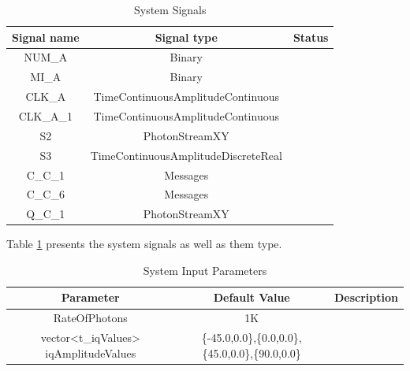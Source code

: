 \begin{enumerate}
\begin{table}[H]
\centering
\caption{System Signals}
\label{tb:signals}
\begin{tabular}{|c|c|c|}
\hline
\textbf{Signal name}            & \textbf{Signal type}                      & \textbf{Status} \\ \hline
NUM\_A                          &  Binary                                   &                 \\ \hline
MI\_A                           &  Binary                                   &                 \\ \hline
CLK\_A                          &  TimeContinuousAmplitudeContinuous        &                 \\ \hline
CLK\_A\_1                       &  TimeContinuousAmplitudeContinuous        &                 \\ \hline
S2                              &  PhotonStreamXY                           &                 \\ \hline
S3                              &  TimeContinuousAmplitudeDiscreteReal      &                 \\ \hline
C\_C\_1                         &  Messages                                 &                 \\ \hline
C\_C\_6                         &  Messages                                 &                 \\ \hline
Q\_C\_1                         &  PhotonStreamXY                           &                 \\ \hline

\end{tabular}
\end{table}

Table \ref{tb:signals} presents the system signals as well as them type.

\begin{table}[H]
\centering
\caption{System Input Parameters}
\label{tb:inputparameters}
\begin{tabular}{|c|c|c|}
\hline
\textbf{Parameter}                      & \textbf{Default Value}                                & \textbf{Description} \\ \hline
RateOfPhotons                           & 1K                                                    &                 \\ \hline
vector<t\_iqValues> iqAmplitudeValues   & \{-45.0,0.0\},\{0.0,0.0\},\{45.0,0.0\},\{90.0,0.0\}   &                 \\ \hline


\end{tabular}
\end{table}
\end{enumerate}
